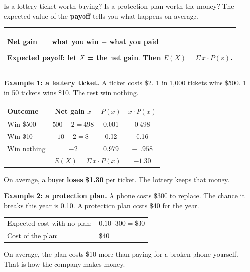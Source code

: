 \documentclass[11pt]{article}
\begin{document}

Is a lottery ticket worth buying? Is a protection plan worth the money? The expected value of the \textbf{payoff} tells you what happens on average.

\vspace{0.4em}
\begin{tabular}{|>{\raggedright\arraybackslash}p{6.7in}|}\hline
\rule{0pt}{1.2em}\textbf{Net gain} $=$ what you win $-$ what you paid \par\vspace{0.3em}
\textbf{Expected payoff}: let $X$ = the net gain. Then $E(X) = \Sigma\, x \cdot P(x)$.\\ \hline
\end{tabular}

\vspace{0.8em}
\textbf{Example 1: a lottery ticket.} A ticket costs \$2. 1 in 1,000 tickets wins \$500. 1 in 50 tickets wins \$10. The rest win nothing.

\begin{center}
\renewcommand{\arraystretch}{1.4}
\begin{tabular}{|l|c|c|c|}\hline
Outcome & Net gain $x$ & $P(x)$ & $x \cdot P(x)$ \\ \hline
Win \$500 & $500 - 2 = 498$ & 0.001 & 0.498 \\ \hline
Win \$10 & $10 - 2 = 8$ & 0.02 & 0.16 \\ \hline
Win nothing & $-2$ & 0.979 & $-1.958$ \\ \hline
\multicolumn{3}{|r|}{$E(X) = \Sigma\, x \cdot P(x)$} & $-1.30$ \\ \hline
\end{tabular}
\end{center}

On average, a buyer \textbf{loses \$1.30} per ticket. The lottery keeps that money.

\vspace{0.8em}
\textbf{Example 2: a protection plan.} A phone costs \$300 to replace. The chance it breaks this year is 0.10.
A protection plan costs \$40 for the year.

\vspace{0.3em}
\begin{tabular}{@{}ll}
Expected cost with no plan: & $0.10 \cdot 300 = \$30$\\
Cost of the plan: & \$40\\
\end{tabular}

\vspace{0.3em}
On average, the plan costs \$10 more than paying for a broken phone yourself. That is how the company makes money.
\end{document}

